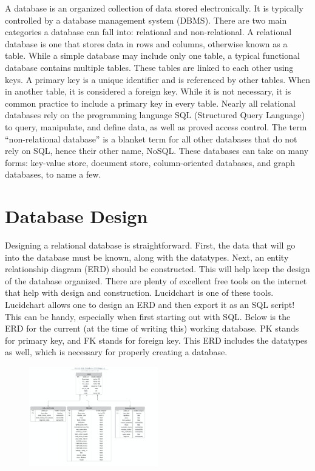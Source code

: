 \documentclass[]{book}
\begin{document}
A database is an organized collection of data stored electronically. It
is typically controlled by a database management system (DBMS). There
are two main categories a database can fall into: relational and
non-relational. A relational database is one that stores data in rows
and columns, otherwise known as a table. While a simple database may
include only one table, a typical functional database contains multiple
tables. These tables are linked to each other using keys. A primary key
is a unique identifier and is referenced by other tables. When in
another table, it is considered a foreign key. While it is not
necessary, it is common practice to include a primary key in every
table. Nearly all relational databases rely on the programming language
SQL (Structured Query Language) to query, manipulate, and define data,
as well as proved access control. The term ``non-relational database''
is a blanket term for all other databases that do not rely on SQL, hence
their other name, NoSQL. These databases can take on many forms:
key-value store, document store, column-oriented databases, and graph
databases, to name a few.

\section{Database Design}\label{database-design}

Designing a relational database is straightforward. First, the data that
will go into the database must be known, along with the datatypes. Next,
an entity relationship diagram (ERD) should be constructed. This will
help keep the design of the database organized. There are plenty of
excellent free tools on the internet that help with design and
construction. Lucidchart is one of these tools. Lucidchart allows one to
design an ERD and then export it as an SQL script! This can be handy,
especially when first starting out with SQL. Below is the ERD for the
current (at the time of writing this) working database. PK stands for
primary key, and FK stands for foreign key. This ERD includes the
datatypes as well, which is necessary for properly creating a database.

\begin{figure}
\centering
\includegraphics[width=0.50000\textwidth]{./images/entity.png}
\caption{}
\end{figure}
\end{document}
